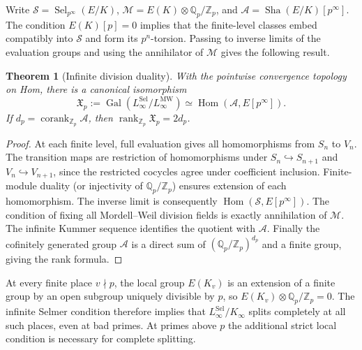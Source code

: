\documentclass[11pt,a4paper]{article}
\newtheorem{theorem}{Theorem}[section]
\theoremstyle{definition}\newtheorem{definition}[theorem]{Definition}
\theoremstyle{remark}\newtheorem{remark}[theorem]{Remark}
\newcommand{\Sha}{\operatorname{\mathrm{Sha}}}
\newcommand{\ZZ}{\mathbb Z}\newcommand{\QQ}{\mathbb Q}\newcommand{\FF}{\mathbb F}
\newcommand{\Gal}{\operatorname{Gal}}\newcommand{\Hom}{\operatorname{Hom}}\newcommand{\End}{\operatorname{End}}\newcommand{\Pic}{\operatorname{Pic}}\newcommand{\NS}{\operatorname{NS}}\newcommand{\Br}{\operatorname{Br}}\newcommand{\Sel}{\operatorname{Sel}}\newcommand{\ord}{\operatorname{ord}}\newcommand{\rk}{\operatorname{rank}}\newcommand{\corank}{\operatorname{corank}}\newcommand{\length}{\operatorname{length}}\newcommand{\Sym}{\operatorname{Sym}}\newcommand{\Cl}{\operatorname{Cl}}\newcommand{\coker}{\operatorname{coker}}\newcommand{\I}{\mathfrak I}\newcommand{\D}{\mathfrak D}\newcommand{\Tdef}{\mathfrak T}
\numberwithin{equation}{section}
\begin{document}
Write $\mathcal S=\Sel_{p^\infty}(E/K)$, $\mathcal M=E(K)\otimes\QQ_p/\ZZ_p$, and $\mathcal A=\Sha(E/K)[p^\infty]$. The condition $E(K)[p]=0$ implies that the finite-level classes embed compatibly into $\mathcal S$ and form its $p^n$-torsion. Passing to inverse limits of the evaluation groups and using the annihilator of $\mathcal M$ gives the following result.
\begin{theorem}[Infinite division duality]\label{thm:infty}
With the pointwise convergence topology on Hom, there is a canonical isomorphism
\begin{equation}
\mathfrak X_p:=\Gal(L_\infty^{\mathrm{Sel}}/L_\infty^{\mathrm{MW}})
\simeq\Hom(\mathcal A,E[p^\infty]).
\end{equation}
If $d_p=\corank_{\ZZ_p}\mathcal A$, then $\rk_{\ZZ_p}\mathfrak X_p=2d_p$.
\end{theorem}
\begin{proof}
At each finite level, full evaluation gives all homomorphisms from $S_n$ to $V_n$. The transition maps are restriction of homomorphisms under $S_n\hookrightarrow S_{n+1}$ and $V_n\hookrightarrow V_{n+1}$, since the restricted cocycles agree under coefficient inclusion. Finite-module duality (or injectivity of $\QQ_p/\ZZ_p$) ensures extension of each homomorphism. The inverse limit is consequently $\Hom(\mathcal S,E[p^\infty])$. The condition of fixing all Mordell--Weil division fields is exactly annihilation of $\mathcal M$. The infinite Kummer sequence identifies the quotient with $\mathcal A$. Finally the cofinitely generated group $\mathcal A$ is a direct sum of $(\QQ_p/\ZZ_p)^{d_p}$ and a finite group, giving the rank formula.
\end{proof}
At every finite place $v\nmid p$, the local group $E(K_v)$ is an extension of a finite group by an open subgroup uniquely divisible by $p$, so $E(K_v)\otimes\QQ_p/\ZZ_p=0$. The infinite Selmer condition therefore implies that $L_\infty^{\mathrm{Sel}}/K_\infty$ splits completely at all such places, even at bad primes. At primes above $p$ the additional strict local condition is necessary for complete splitting.
\end{document}

